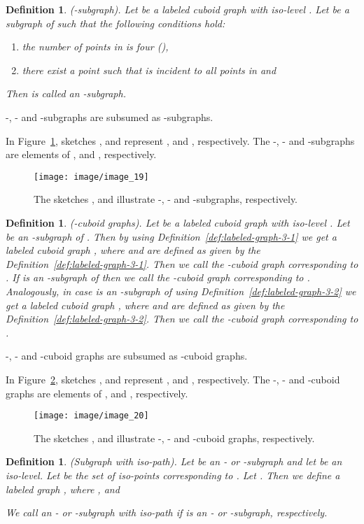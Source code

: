 \documentclass[a4paper,11pt]{article}
\newtheorem{definition}[theorem]{Definition}
\begin{document}
\begin{definition}(-subgraph). Let  be a labeled cuboid graph
with iso-level . Let  be a subgraph of  such that the following
conditions hold:
\begin{enumerate}
\item the number of points in  is four (),
\item there exist a point  such that  is incident to all points  in  and

\end{enumerate}
Then  is called an -subgraph.
\label{def:iso-path-12}
\end{definition}
\noindent -, - and -subgraphs are subsumed as -subgraphs.

In Figure~\ref{image_19_hier}, sketches ,  and  represent ,
 and , respectively. The -, - and -subgraphs
are elements of ,  and , respectively.
\begin{figure}[!ht]
\texttt{[image: image/image\_19]}
\caption{The sketches ,  and  illustrate -, - and  -subgraphs,
respectively.}
\label{image_19_hier}
\end{figure}
\FloatBarrier
\begin{definition}(-cuboid graphs). Let  be a labeled cuboid graph
with iso-level . Let  be an -subgraph of . Then by
using Definition~\ref{def:labeled-graph-3-1} we get a labeled cuboid graph ,
where  and  are defined as given by the Definition~\ref{def:labeled-graph-3-1}. Then
we call  the -cuboid graph corresponding to . If  is an
-subgraph of  then we call  the -cuboid graph corresponding to .
Analogously, in case  is an -subgraph of  using Definition~\ref{def:labeled-graph-3-2}
we get a labeled cuboid graph , where  and  are defined as given
by the Definition~\ref{def:labeled-graph-3-2}. Then we call  the -cuboid graph
corresponding to .
\label{def:iso-path-10-11-12}
\end{definition}
\noindent -, - and -cuboid graphs are subsumed as -cuboid graphs.

In Figure~\ref{image_20}, sketches ,  and  represent ,
 and , respectively. The -, - and -cuboid graphs
are elements of ,  and , respectively.
\begin{figure}[!ht]
\texttt{[image: image/image\_20]}
\caption{The sketches ,  and  illustrate -, - and  -cuboid graphs,
respectively.}
\label{image_20}
\end{figure}
\FloatBarrier
\begin{definition}(Subgraph with iso-path).
Let  be an - or -subgraph and let  be an iso-level.
Let  be the set of iso-points
corresponding to . Let .
Then we define a labeled graph , where
,  and

We call  an - or -subgraph with iso-path if  is an - or -subgraph,
respectively.
\label{def:iso-path-13}
\end{definition}
\end{document}
